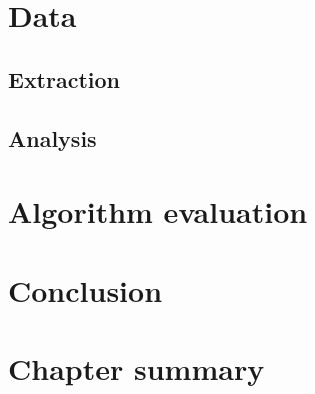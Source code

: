 \section{Data}

\subsection{Extraction}

\subsection{Analysis}


\section{Algorithm evaluation}

\section{Conclusion}

\section{Chapter summary}